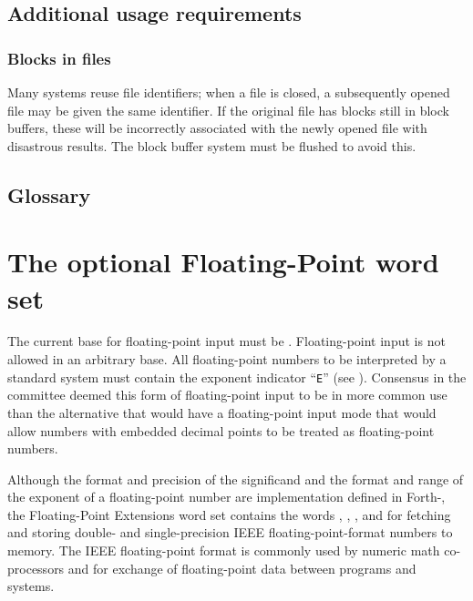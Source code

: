 \setcounter{subsection}{2}
\subsection{Additional usage requirements} %

\setcounter{subsubsection}{1}
\subsubsection{Blocks in files} %

Many systems reuse file identifiers; when a file is closed, a
subsequently opened file may be given the same identifier. If the
original file has blocks still in block buffers, these will be
incorrectly associated with the newly opened file with disastrous
results. The block buffer system must be flushed to avoid this.


\setcounter{subsection}{5}
\subsection{Glossary} %



\section{The optional Floating-Point word set} %
\label{rat:floating}

	The current base for floating-point input must be .
	Floating-point input is not allowed in an arbitrary base. All
	floating-point numbers to
	be interpreted by a standard system must contain the exponent
	indicator ``\texttt{E}'' (see ). Consensus in the committee deemed
	this form of floating-point input to be in more common use than
	the alternative that would have a floating-point input mode that
	would allow numbers with embedded decimal points to be treated
	as floating-point numbers.

	Although the format and precision of the significand and the format
	and range of the exponent of a floating-point number are
	implementation defined in Forth-\snapshot, the Floating-Point
	Extensions word set contains the words
	, , , and 
	for fetching and storing double- and single-precision IEEE
	floating-point-format numbers to memory. The IEEE floating-point
	format is commonly used by numeric math co-processors and for
	exchange of floating-point data between programs and systems.

